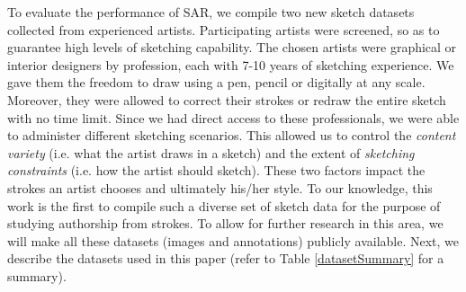 To evaluate the performance of SAR, we compile two new sketch datasets collected from experienced artists. Participating artists were screened, so as to guarantee high levels of sketching capability. The chosen artists were graphical or interior designers by profession, each with 7-10 years of sketching experience. We gave them the freedom to draw using a pen, pencil or digitally at any scale. Moreover, they were allowed to correct their strokes or redraw the entire sketch with no time limit. Since we had direct access to these professionals, we were able to administer different sketching scenarios. This allowed us to control the \emph{content variety} (i.e. what the artist draws in a sketch) and the extent of \emph{sketching constraints} (i.e. how the artist should sketch). These two factors impact the strokes an artist chooses and ultimately his/her style. To our knowledge, this work is the first to compile such a diverse set of sketch data for the purpose of studying authorship from strokes. To allow for further research in this area, we will make all these datasets (images and annotations) publicly available. Next, we describe the datasets used in this paper (refer to Table \ref{datasetSummary} for a summary).



